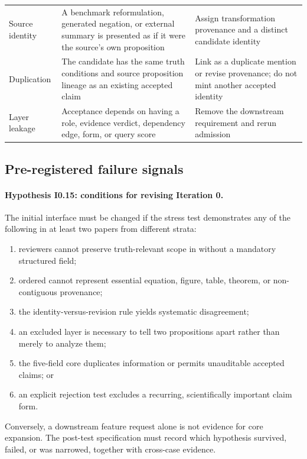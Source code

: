 \begin{longtable}{>{\raggedright\arraybackslash}p{}>{\raggedright\arraybackslash}p{}>{\raggedright\arraybackslash}p{}}
Source identity & A benchmark reformulation, generated negation, or external summary is presented as if it were the source's own proposition & Assign transformation provenance and a distinct candidate identity \\
Duplication & The candidate has the same truth conditions and source proposition lineage as an existing accepted claim & Link as a duplicate mention or revise provenance; do not mint another accepted identity \\
Layer leakage & Acceptance depends on having a role, evidence verdict, dependency edge, \MathClaimIR{} form, or query score & Remove the downstream requirement and rerun admission \\
\bottomrule
\end{longtable}
\normalsize

\subsection{Pre-registered failure signals}

\paragraph{Hypothesis I0.15: conditions for revising Iteration 0.}
The initial interface must be changed if the stress test demonstrates any of the following in at least two papers from different strata:
\begin{enumerate}
  \item reviewers cannot preserve truth-relevant scope in  without a mandatory structured field;
  \item ordered  cannot represent essential equation, figure, table, theorem, or non-contiguous provenance;
  \item the identity-versus-revision rule yields systematic disagreement;
  \item an excluded layer is necessary to tell two propositions apart rather than merely to analyze them;
  \item the five-field core duplicates information or permits unauditable accepted claims; or
  \item an explicit rejection test excludes a recurring, scientifically important claim form.
\end{enumerate}
Conversely, a downstream feature request alone is not evidence for core expansion. The post-test specification must record which hypothesis survived, failed, or was narrowed, together with cross-case evidence.